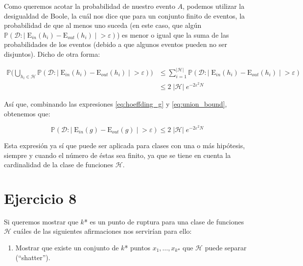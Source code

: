 \documentclass[11pt,a4paper]{article}
\newcommand{\addtoc}[1]{\addcontentsline{toc}{section}{#1}}
\begin{document}
Como queremos acotar la probabilidad de nuestro evento $A$, podemos utilizar la desigualdad de Boole, 
la cuál nos dice que para un conjunto finito de eventos, la probabilidad de que al menos uno suceda (en este caso, que algún
$\mathbb{P}(\mathcal{D}: | \; \text{E}_{in}(h_i) - \text{E}_{out}(h_i) \; | \; > \varepsilon)$) es menor o igual que la suma
de las probabilidades de los eventos (debido a que algunos eventos pueden no ser disjuntos). Dicho de otra forma:

\begin{equation}
\label{eq:union_bound}
\begin{split}
	\mathbb{P} \Bigg( \bigcup_{h_i \in \mathcal{H}}
	\mathbb{P}(\mathcal{D}: | \; \text{E}_{in}(h_i) - \text{E}_{out}(h_i) \; | \; > \varepsilon) \Bigg) &\leq
	\sum_{i = 1}^{|\mathcal{H}|} \mathbb{P}(\mathcal{D}: | \;\text{E}_{in}(h_i) - \text{E}_{out}(h_i) \; | \; > \varepsilon) \\
	&\leq 2 \; |\mathcal{H}|  \; e^{-2\varepsilon^2N}
\end{split}
\end{equation}

Así que, combinando las expresiones \eqref{eq:hoeffding_g} y \eqref{eq:union_bound}, obtenemos que:

\begin{equation}
	\mathbb{P}(\mathcal{D}: | \; \text{E}_{in}(g) - \text{E}_{out}(g) \; | \; > \varepsilon)  \leq
	2 \; |\mathcal{H}|  \; e^{-2\varepsilon^2N}
\end{equation}


Esta expresión ya sí que puede ser aplicada para clases con una o más hipótesis, siempre y cuando el número de éstas
sea finito, ya que se tiene en cuenta la cardinalidad de la clase de funciones $\mathcal{H}$.

\section*{Ejercicio 8}
\addtoc{Ejercicio 8}

\noindent Si queremos mostrar que $k$* es un punto de ruptura para una clase de funciones $\mathcal{H}$ cuáles de las
siguientes afirmaciones nos servirían para ello:

\begin{enumerate}[label=\textit{\alph*})]
	\item Mostrar que existe un conjunto de $k$* puntos $x_1, \dots, x_{k\text{*}}$ que $\mathcal{H}$ puede separar 
	(``shatter'').
\end{enumerate}
\end{document}
